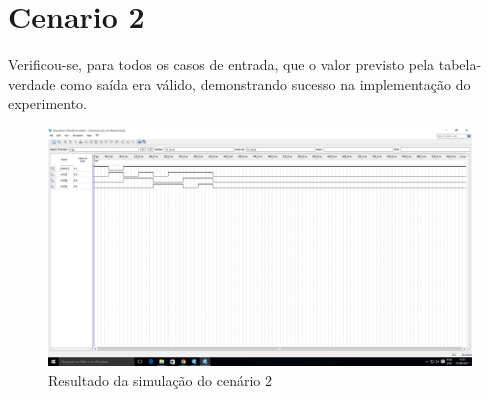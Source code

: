 \section{Cenario 2}
	Verificou-se, para todos os casos de entrada, que o valor previsto pela tabela-verdade
	como saída era válido, demonstrando sucesso na implementação do experimento.

	\begin{figure}[H]
	    \centering
		\caption{\label{fig:printSimulacao}Resultado da simulação do cenário 2}
		\includegraphics[width=1\textwidth]{img/cenario2/printSimulacao}
	\end{figure}

